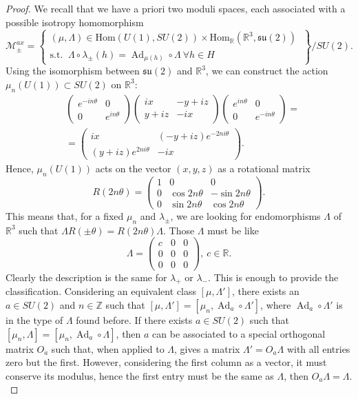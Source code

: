 \documentclass{article}
\numberwithin{equation}{section}
\theoremstyle{definition}
\newcommand{\R}{\mathbb{R}}
\newcommand{\su}[1]{\mathfrak{su}(#1)}
\newcommand{\Ad}{\operatorname{Ad}}
\begin{document}
\begin{proof}
    We recall that we have a priori two moduli spaces, each associated with a possible isotropy homomorphism
    \[\mathcal{M}^{ax}_{\pm}=\left\{\begin{matrix}(\mu,\Lambda)\in \mathrm{Hom}(U(1),SU(2))\times \mathrm{Hom}_{\R}(\R^3,\su{2})\ \\ \mbox{s.t. }\ \Lambda\circ \lambda_{\pm}(h)=\Ad_{\mu(h)}\circ \Lambda \  \forall h\in H\end{matrix}\right\}/SU(2).\]
    Using the isomorphism between $\su{2}$ and $\R^3$, we can construct the action $\mu_n(U(1))\subset SU(2)$ on $\R^3$:
    \begin{align*}
    &    \begin{pmatrix}
        e^{-in\theta} & 0\\
        0 & e^{in\theta}
    \end{pmatrix}\begin{pmatrix}
        ix & -y+iz \\
        y+iz & -ix
    \end{pmatrix}\begin{pmatrix}
        e^{in\theta} & 0\\
        0 & e^{-in\theta}
    \end{pmatrix}=\\
    &=\begin{pmatrix}
        ix & (-y+iz)e^{-2ni\theta} \\
        (y+iz)e^{2ni\theta} & -ix
    \end{pmatrix}.
    \end{align*}
    Hence, $\mu_n(U(1))$ acts on the vector $(x,y,z)$ as a rotational matrix \[R(2n\theta)=\begin{pmatrix}
        1 & 0 & 0\\
        0 & \cos{2n\theta} & -\sin{2n\theta}\\
        0 & \sin{2n\theta} & \cos{2n\theta}
    \end{pmatrix}.\]
    This means that, for a fixed $\mu_n$ and $\lambda_{\pm}$, we are looking for endomorphisms $\Lambda$ of $\R^3$ such that $\Lambda R(\pm\theta)=R(2n\theta)\Lambda$. Those $\Lambda$ must be like
    \[\Lambda=\begin{pmatrix}
        c & 0 & 0\\
        0 & 0 & 0\\
        0 & 0 & 0
    \end{pmatrix},\ c\in\R.\]
    Clearly the description is the same for $\lambda_{+}$ or $\lambda_{-}$. This is enough to provide the classification. Considering an equivalent class $[\mu,\Lambda']$, there exists an $a\in SU(2)$ and $n\in \mathbb{Z}$ such that $[\mu,\Lambda']=[\mu_n,\Ad_a\circ\Lambda']$, where $\Ad_a\circ\Lambda'$ is in the type of $\Lambda$ found before. If there exists $a\in SU(2)$ such that $[\mu_n,\Lambda]=[\mu_n,\Ad_a\circ\Lambda]$, then $a$ can be associated to a special orthogonal matrix $O_a$ such that, when applied to $\Lambda$, gives a matrix $\Lambda'=O_a\Lambda$ with all entries zero but the first. However, considering the first column as a vector, it must conserve its modulus, hence the first entry must be the same as $\Lambda$, then $O_a\Lambda=\Lambda$.\\

\end{proof}
\end{document}
